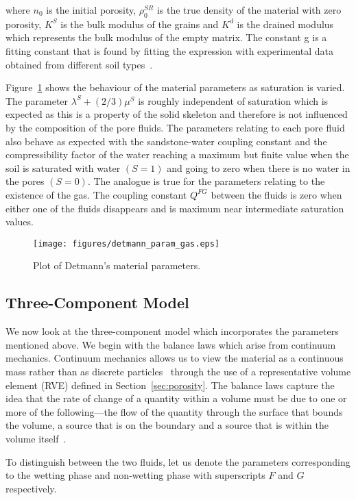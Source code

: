 \documentclass[twocolumn]{article}
\begin{document}
where $n_0$ is the initial porosity, $\rho_0^{SR}$ is the true density of the material with zero porosity, $K^S$ is the bulk modulus of the grains and $K^d$ is the drained modulus which represents the bulk modulus of the empty matrix. The constant g is a fitting constant that is found by fitting the expression with experimental data obtained from different soil types~\cite{white_1983}.

Figure~\ref{fig:detmann_param_gas} shows the behaviour of the material parameters as saturation is varied. The parameter $\lambda^S + (2/3)\mu^S$ is roughly independent of saturation which is expected as this is a property of the solid skeleton and therefore is not influenced by the composition of the pore fluids. The parameters relating to each pore fluid also behave as expected with the sandstone-water coupling constant and the compressibility factor of the water reaching a maximum but finite value when the soil is saturated with water $(S = 1)$ and going to zero when there is no water in the pores $(S = 0)$. The analogue is true for the parameters relating to the existence of the gas. The coupling constant $Q^{FG}$ between the fluids is zero when either one of the fluids disappears and is maximum near intermediate saturation values.

\begin{figure}
    \centering
    \texttt{[image: figures/detmann\_param\_gas.eps]}
    \caption{Plot of Detmann's material parameters.}
    \label{fig:detmann_param_gas}
\end{figure}

\subsection{Three-Component Model}
We now look at the three-component model which incorporates the parameters mentioned above. We begin with the balance laws which arise from continuum mechanics. Continuum mechanics allows us to view the material as a continuous mass rather than as discrete particles~\cite{ostoja-starzewski_zhang_2016} through the use of a representative volume element (RVE) defined in Section~\ref{sec:porosity}. The balance laws capture the idea that the rate of change of a quantity within a volume must be due to one or more of the following---the flow of the quantity through the surface that bounds the volume, a source that is on the boundary and a source that is within the volume itself~\cite{jog_2015}.

To distinguish between the two fluids, let us denote the parameters corresponding to the wetting phase and non-wetting phase with superscripts $F$ and $G$ respectively.
\end{document}
